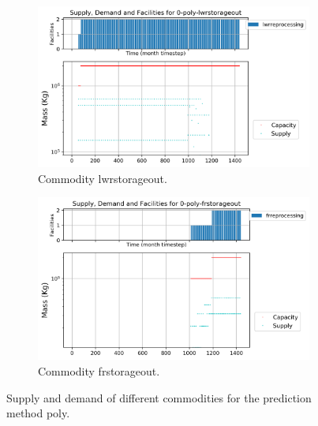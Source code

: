 \documentclass[11pt]{article}
\begin{document}
\begin{figure}[H]
	\centering
	\begin{subfigure}[t]{0.45\textwidth}
		\centering
		\includegraphics[width=\linewidth]{23-figures/0-poly-lwrstorageout.png} 
		\caption{Commodity lwrstorageout.}
		\label{fig:23-lwrstorageout}
	\end{subfigure}
	\vspace{1cm}
	\begin{subfigure}[t]{0.45\textwidth}
		\centering
		\includegraphics[width=\linewidth]{23-figures/0-poly-frstorageout.png} 
		\caption{Commodity frstorageout.}
		\label{fig:23-frstorageout}
	\end{subfigure}
	\hfill
	\caption{Supply and demand of different commodities for the prediction method poly.}
	\label{fig:23-storageout}
\end{figure}
\end{document}
